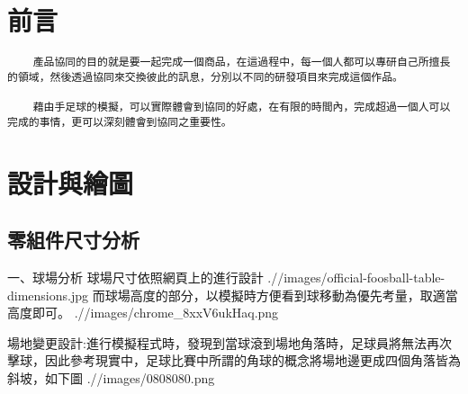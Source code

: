 \documentclass[12pt,,]{report}
\begin{document}
\begingroup
    \renewcommand{\contentsname}{\center 目錄 \addcontentsline{toc}{chapter}{目錄}}
    \renewcommand{\numberline}[1]{~#1\hspace*{1em}}
        \setcounter{tocdepth}{2}
    \tableofcontents
    \newcommand{\lotlabel}{表}
    \renewcommand{\listtablename}{\center 表目錄 \addcontentsline{toc}{chapter}{表目錄}}
    \renewcommand{\numberline}[1]{\lotlabel~#1\hspace*{1em}}
    \listoftables
    \newcommand{\loflabel}{圖}
    \renewcommand{\listfigurename}{\center 圖目錄 \addcontentsline{toc}{chapter}{圖目錄}}
    \renewcommand{\numberline}[1]{\loflabel~#1\hspace*{1em}}
    \listoffigures
\endgroup

\mainmatter
\hypertarget{ux524dux8a00}{%
\chapter{前言}\label{ux524dux8a00}}

\begin{verbatim}
    產品協同的目的就是要一起完成一個商品，在這過程中，每一個人都可以專研自己所擅長的領域，然後透過協同來交換彼此的訊息，分別以不同的研發項目來完成這個作品。

    藉由手足球的模擬，可以實際體會到協同的好處，在有限的時間內，完成超過一個人可以完成的事情，更可以深刻體會到協同之重要性。
\end{verbatim}

\hypertarget{ux8a2dux8a08ux8207ux7e6aux5716}{%
\chapter{設計與繪圖}\label{ux8a2dux8a08ux8207ux7e6aux5716}}

\hypertarget{ux96f6ux7d44ux4ef6ux5c3aux5bf8ux5206ux6790}{%
\section{零組件尺寸分析}\label{ux96f6ux7d44ux4ef6ux5c3aux5bf8ux5206ux6790}}

一、球場分析 球場尺寸依照網頁上的進行設計
.//images/official-foosball-table-dimensions.jpg
而球場高度的部分，以模擬時方便看到球移動為優先考量，取適當高度即可。
.//images/chrome\_8xxV6ukHaq.png

場地變更設計:進行模擬程式時，發現到當球滾到場地角落時，足球員將無法再次擊球，因此參考現實中，足球比賽中所謂的角球的概念將場地邊更成四個角落皆為斜坡，如下圖
.//images/0808080.png
\end{document}
